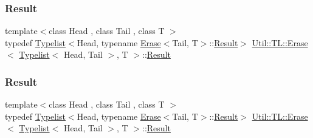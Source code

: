 \subsubsection{\texorpdfstring{Result}{Result}\hspace{0.1cm}{\footnotesize\ttfamily [1/3]}}
{\footnotesize\ttfamily template$<$class Head , class Tail , class T $>$ \\
typedef \mbox{\hyperlink{structUtil_1_1Typelist}{Typelist}}$<$Head, typename \mbox{\hyperlink{structUtil_1_1TL_1_1Erase}{Erase}}$<$Tail, T$>$\+::\mbox{\hyperlink{structUtil_1_1TL_1_1Erase_3_01Typelist_3_01Head_00_01Tail_01_4_00_01T_01_4_a68b3e32a3703ec33f196f25e84e3841e}{Result}}$>$ \mbox{\hyperlink{structUtil_1_1TL_1_1Erase}{Util\+::\+T\+L\+::\+Erase}}$<$ \mbox{\hyperlink{structUtil_1_1Typelist}{Typelist}}$<$ Head, Tail $>$, T $>$\+::\mbox{\hyperlink{structUtil_1_1TL_1_1Erase_3_01Typelist_3_01Head_00_01Tail_01_4_00_01T_01_4_a68b3e32a3703ec33f196f25e84e3841e}{Result}}}

\mbox{\label{structUtil_1_1TL_1_1Erase_3_01Typelist_3_01Head_00_01Tail_01_4_00_01T_01_4_a68b3e32a3703ec33f196f25e84e3841e}} 
\subsubsection{\texorpdfstring{Result}{Result}\hspace{0.1cm}{\footnotesize\ttfamily [2/3]}}
{\footnotesize\ttfamily template$<$class Head , class Tail , class T $>$ \\
typedef \mbox{\hyperlink{structUtil_1_1Typelist}{Typelist}}$<$Head, typename \mbox{\hyperlink{structUtil_1_1TL_1_1Erase}{Erase}}$<$Tail, T$>$\+::\mbox{\hyperlink{structUtil_1_1TL_1_1Erase_3_01Typelist_3_01Head_00_01Tail_01_4_00_01T_01_4_a68b3e32a3703ec33f196f25e84e3841e}{Result}}$>$ \mbox{\hyperlink{structUtil_1_1TL_1_1Erase}{Util\+::\+T\+L\+::\+Erase}}$<$ \mbox{\hyperlink{structUtil_1_1Typelist}{Typelist}}$<$ Head, Tail $>$, T $>$\+::\mbox{\hyperlink{structUtil_1_1TL_1_1Erase_3_01Typelist_3_01Head_00_01Tail_01_4_00_01T_01_4_a68b3e32a3703ec33f196f25e84e3841e}{Result}}}

\mbox{\label{structUtil_1_1TL_1_1Erase_3_01Typelist_3_01Head_00_01Tail_01_4_00_01T_01_4_a68b3e32a3703ec33f196f25e84e3841e}} 
